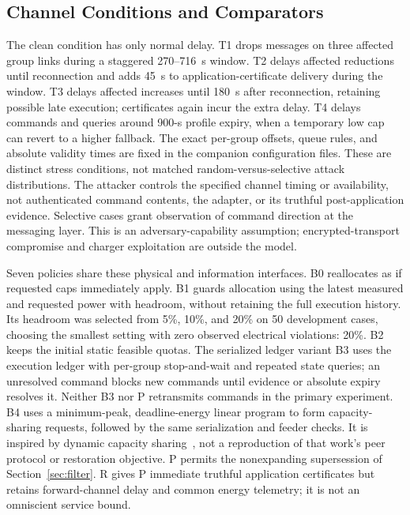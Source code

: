 \subsection{Channel Conditions and Comparators}
The clean condition has only normal delay. T1 drops messages on three affected
group links during a staggered 270--716~s window. T2 delays affected reductions
until reconnection and adds 45~s to application-certificate delivery during the
window. T3 delays affected increases until 180~s after reconnection, retaining
possible late execution; certificates again incur the extra delay. T4 delays
commands and queries around 900-s profile expiry, when a temporary low cap can
revert to a higher fallback. The exact per-group offsets, queue rules, and
absolute validity times are fixed in the companion configuration files.
These are distinct stress conditions, not matched random-versus-selective
attack distributions. The attacker controls the specified channel timing or
availability, not authenticated command contents, the adapter, or its truthful
post-application evidence.
Selective cases grant observation of command direction at the messaging layer.
This is an adversary-capability assumption; encrypted-transport compromise and
charger exploitation are outside the model.

Seven policies share these physical and information interfaces. B0 reallocates
as if requested caps immediately apply. B1 guards allocation using the latest
measured and requested power with headroom, without retaining the full execution
history. Its headroom was selected from 5\%, 10\%, and 20\% on 50 development
cases, choosing the smallest setting with zero observed electrical violations:
20\%. B2 keeps the initial static feasible quotas. The serialized ledger variant
B3 uses the execution ledger
with per-group stop-and-wait and repeated state queries; an unresolved command
blocks new commands until evidence or absolute expiry resolves it. Neither B3
nor P retransmits commands in the primary experiment. B4 uses a minimum-peak,
deadline-energy linear program to form
capacity-sharing requests, followed by the same serialization and feeder checks.
It is inspired by dynamic capacity sharing~\cite{gumrukcu2024dcs}, not a
reproduction of that work's peer protocol or restoration objective. P permits
the nonexpanding supersession of Section~\ref{sec:filter}. R gives P immediate
truthful application certificates but retains forward-channel delay and common
energy telemetry; it is not an omniscient service bound.


